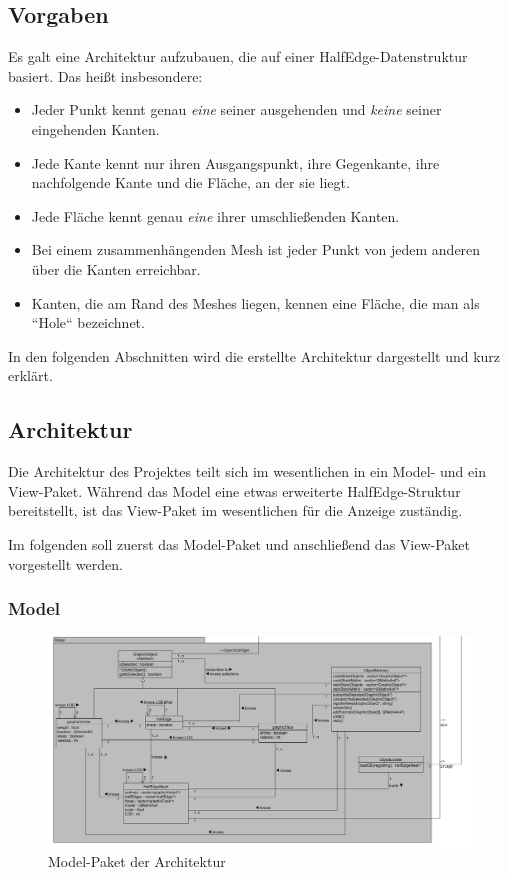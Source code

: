 \subsection{Vorgaben}
Es galt eine Architektur aufzubauen, die auf einer HalfEdge-Datenstruktur basiert. Das heißt insbesondere:
\begin{itemize}
\item Jeder Punkt kennt genau \textit{eine} seiner ausgehenden und \textit{keine} seiner eingehenden Kanten.
\item Jede Kante kennt nur ihren Ausgangspunkt, ihre Gegenkante, ihre nachfolgende Kante und die Fläche, an der sie liegt.
\item Jede Fläche kennt genau \textit{eine} ihrer umschließenden Kanten. 
\item Bei einem zusammenhängenden Mesh ist jeder Punkt von jedem anderen über die Kanten erreichbar.
\item Kanten, die am Rand des Meshes liegen, kennen eine Fläche, die man als ``Hole`` bezeichnet.
\end{itemize}
In den folgenden Abschnitten wird die erstellte Architektur dargestellt und kurz erklärt.

\subsection{Architektur}
Die Architektur des Projektes teilt sich im wesentlichen in ein Model- und ein View-Paket. 
Während das Model eine etwas erweiterte HalfEdge-Struktur bereitstellt, ist das View-Paket im wesentlichen für die Anzeige zuständig. 

Im folgenden soll zuerst das Model-Paket und anschlie\ss{}end das View-Paket vorgestellt werden.

\subsubsection{Model}
\begin{figure}[htbp]
\centering
\includegraphics[angle=90,scale=0.5]{content/pictures/architekturModel.png}
\caption{Model-Paket der Architektur}
\label{fig:model}
\end{figure}

